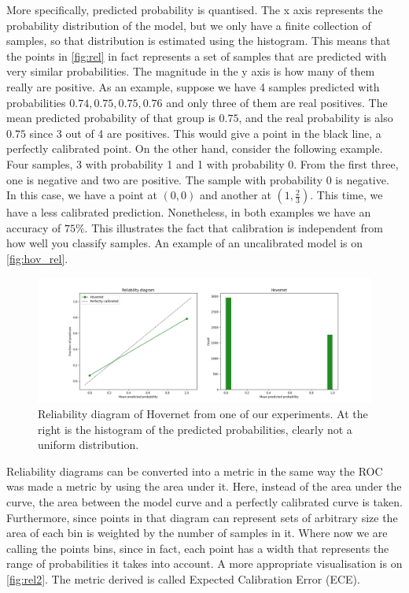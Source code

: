 More specifically, predicted probability is quantised. The x axis represents the probability distribution of the model, but we only have a finite collection of samples, so that distribution is estimated using the histogram. This means that the points in \autoref{fig:rel} in fact represents a set of samples that are predicted with very similar probabilities. The magnitude in the y axis is how many of them really are positive. As an example, suppose we have 4 samples predicted with probabilities $0.74, 0.75, 0.75, 0.76$ and only three of them are real positives. The mean predicted probability of that group is $0.75$, and the real probability is also $0.75$ since 3 out of 4 are positives. This would give a point in the black line, a perfectly calibrated point. On the other hand, consider the following example. Four samples, 3 with probability 1 and 1 with probability 0. From the first three, one is negative and two are positive. The sample with probability 0 is negative. In this case, we have a point at $(0,0)$ and another at $(1,\frac{2}{3})$. This time, we have a less calibrated prediction. Nonetheless, in both examples we have an accuracy of $75\%$. This illustrates the fact that calibration is independent from how well you classify samples. An example of an uncalibrated model is on \autoref{fig:hov_rel}.

\begin{figure}[ht]
    \centering
    \includegraphics[width=\textwidth]{imgs/hov_rel_diag.png}
    \caption{Reliability diagram of Hovernet from one of our experiments. At the right is the histogram of the predicted probabilities, clearly not a uniform distribution.}
    \label{fig:hov_rel}
\end{figure}

Reliability diagrams can be converted into a metric in the same way the ROC was made a metric by using the area under it. Here, instead of the area under the curve, the area between the model curve and a perfectly calibrated curve is taken. Furthermore, since points in that diagram can represent sets of arbitrary size the area of each bin is weighted by the number of samples in it. Where now we are calling the points bins, since in fact, each point has a width that represents the range of probabilities it takes into account. A more appropriate visualisation is on \autoref{fig:rel2}. The metric derived is called Expected Calibration Error (ECE).

